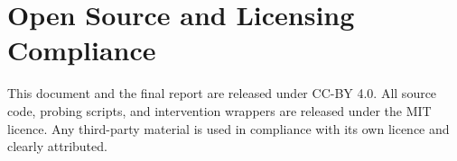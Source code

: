 \documentclass[11pt,a4paper]{article}
\begin{document}
\section{Open Source and Licensing Compliance}

This document and the final report are released under CC-BY 4.0. All source code, probing scripts, and intervention wrappers are released under the MIT licence. Any third-party material is used in compliance with its own licence and clearly attributed.

\printbibliography
\end{document}
